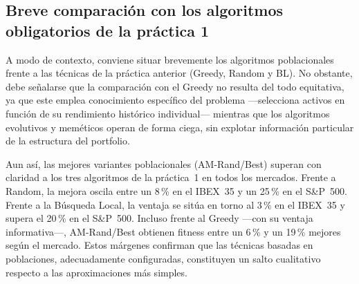 \subsection{Breve comparación con los algoritmos obligatorios de la práctica 1}

A modo de contexto, conviene situar brevemente los algoritmos poblacionales frente a las técnicas de la práctica anterior (Greedy, Random y BL). No obstante, debe señalarse que la comparación con el Greedy no resulta del todo equitativa, ya que este emplea conocimiento específico del problema ---selecciona activos en función de su rendimiento histórico individual--- mientras que los algoritmos evolutivos y meméticos operan de forma ciega, sin explotar información particular de la estructura del portfolio.

Aun así, las mejores variantes poblacionales (AM-Rand/Best) superan con claridad a los tres algoritmos de la práctica~1 en todos los mercados. Frente a Random, la mejora oscila entre un 8\,\% en el IBEX~35 y un 25\,\% en el S\&P~500. Frente a la Búsqueda Local, la ventaja se sitúa en torno al 3\,\% en el IBEX~35 y supera el 20\,\% en el S\&P~500. Incluso frente al Greedy ---con su ventaja informativa---, AM-Rand/Best obtienen fitness entre un 6\,\% y un 19\,\% mejores según el mercado. Estos márgenes confirman que las técnicas basadas en poblaciones, adecuadamente configuradas, constituyen un salto cualitativo respecto a las aproximaciones más simples.